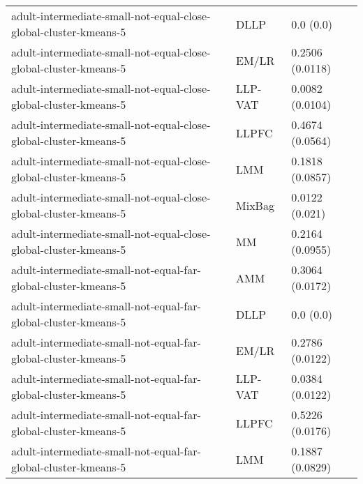 \begin{longtable}{lll}
                                             adult-intermediate-small-not-equal-close-global-cluster-kmeans-5 &      DLLP &                                 0.0 (0.0) \\
                                             adult-intermediate-small-not-equal-close-global-cluster-kmeans-5 &     EM/LR &                           0.2506 (0.0118) \\
                                             adult-intermediate-small-not-equal-close-global-cluster-kmeans-5 &   LLP-VAT &                           0.0082 (0.0104) \\
                                             adult-intermediate-small-not-equal-close-global-cluster-kmeans-5 &     LLPFC &                           0.4674 (0.0564) \\
                                             adult-intermediate-small-not-equal-close-global-cluster-kmeans-5 &       LMM &                           0.1818 (0.0857) \\
                                             adult-intermediate-small-not-equal-close-global-cluster-kmeans-5 &    MixBag &                            0.0122 (0.021) \\
                                             adult-intermediate-small-not-equal-close-global-cluster-kmeans-5 &        MM &                           0.2164 (0.0955) \\
                                               adult-intermediate-small-not-equal-far-global-cluster-kmeans-5 &       AMM &                           0.3064 (0.0172) \\
                                               adult-intermediate-small-not-equal-far-global-cluster-kmeans-5 &      DLLP &                                 0.0 (0.0) \\
                                               adult-intermediate-small-not-equal-far-global-cluster-kmeans-5 &     EM/LR &                           0.2786 (0.0122) \\
                                               adult-intermediate-small-not-equal-far-global-cluster-kmeans-5 &   LLP-VAT &                           0.0384 (0.0122) \\
                                               adult-intermediate-small-not-equal-far-global-cluster-kmeans-5 &     LLPFC &                           0.5226 (0.0176) \\
                                               adult-intermediate-small-not-equal-far-global-cluster-kmeans-5 &       LMM &                           0.1887 (0.0829) \\

\end{longtable}
